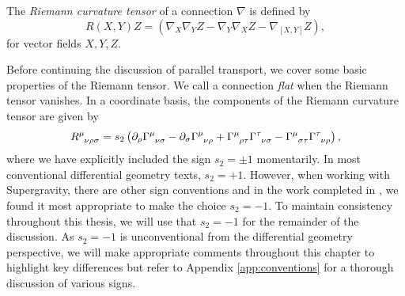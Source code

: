 \begin{defn}
	The \emph{Riemann curvature tensor} of a connection $\nabla$ is defined by
	\begin{equation}
	\label{eq:riem}
		R(X,Y) Z = \left( \nabla_X \nabla_Y Z - \nabla_Y \nabla_X Z - \nabla_{[X,Y]} Z \right),
	\end{equation}
	for vector fields $X,Y,Z$. 
\end{defn}
Before continuing the discussion of parallel transport, we cover some basic properties of the Riemann tensor. We call a connection \emph{flat} when the Riemann tensor vanishes. In a coordinate basis, the components of the Riemann curvature tensor are given by
\begin{equation}
\label{eq:riemannchs}
   \tensor{R}{^\mu_{\nu \rho \sigma}} = s_2 \left( \partial_\rho \tensor{\Gamma}{^{\mu}_{\nu \sigma}} - \partial_\sigma \tensor{\Gamma}{^{\mu}_{\nu \rho}} + \tensor{\Gamma}{^{\mu}_{\rho \tau}}\tensor{\Gamma}{^{\tau}_{\nu \sigma}} - \tensor{\Gamma}{^{\mu}_{\sigma \tau}}\tensor{\Gamma}{^{\tau}_{\nu \rho}} \right),
\end{equation}
where we have explicitly included the sign $s_2 = \pm 1$ momentarily. In most conventional differential geometry texts, $s_2 = +1$. However, when working with Supergravity, there are other sign conventions and in the work completed in \cite{Gutowski:2019iyo, Gutowski:2020fzb}, we found it most appropriate to make the choice $s_2 = -1$. To maintain consistency throughout this thesis, we will use that $s_2 = -1$ for the remainder of the discussion. As $s_2 = -1$ is unconventional from the differential geometry perspective, we will make appropriate comments throughout this chapter to highlight key differences but refer to Appendix \ref{app:conventions} for a thorough discussion of various signs.

